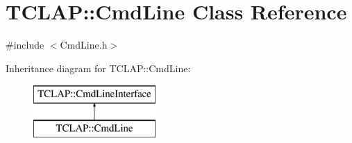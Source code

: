 \hypertarget{class_t_c_l_a_p_1_1_cmd_line}{}\section{T\+C\+L\+A\+P\+:\+:Cmd\+Line Class Reference}
\label{class_t_c_l_a_p_1_1_cmd_line}


{\ttfamily \#include $<$Cmd\+Line.\+h$>$}

Inheritance diagram for T\+C\+L\+A\+P\+:\+:Cmd\+Line\+:\begin{figure}[H]
\begin{center}
\leavevmode
\includegraphics[height=2.000000cm]{class_t_c_l_a_p_1_1_cmd_line}
\end{center}
\end{figure}
